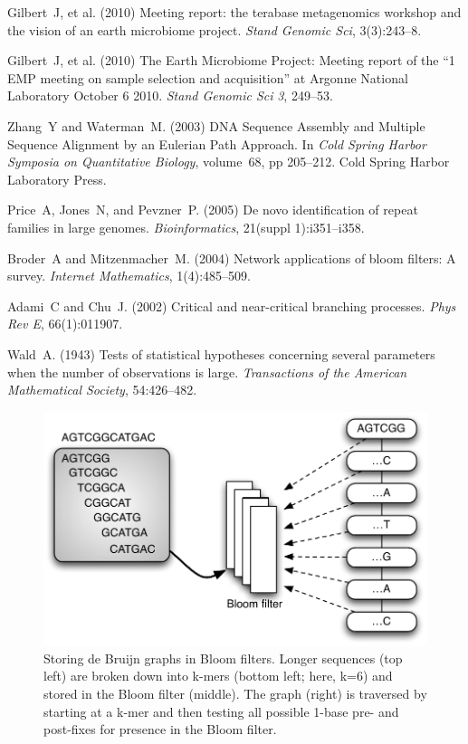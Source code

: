 \documentclass{pnastwo}
\begin{document}
\begin{article}
\begin{thebibliography}{10}
 Gilbert~J, et al. (2010) Meeting report: the terabase 
metagenomics workshop and the vision of an earth microbiome project. {\it 
Stand Genomic Sci}, 3(3):243--8.

 Gilbert~J, et al. (2010) The Earth Microbiome Project: 
Meeting report of the ``1 EMP meeting on sample selection and acquisition'' 
at Argonne National Laboratory October 6 2010. {\it Stand Genomic Sci} 
\emph{3}, 249--53.

 Zhang~Y and Waterman~M. (2003) DNA Sequence Assembly 
and Multiple Sequence Alignment by an Eulerian Path Approach. In {\it Cold 
Spring Harbor Symposia on Quantitative Biology}, volume~68, pp 205--212. 
Cold Spring Harbor Laboratory Press.

 Price~A, Jones~N, and Pevzner~P. (2005) De novo 
identification of repeat families in large genomes. {\it Bioinformatics}, 
21(suppl 1):i351--i358.

Broder~A and Mitzenmacher~M. (2004) Network applications of bloom filters: 
A survey. {\it Internet Mathematics}, 1(4):485--509.

 Adami~C and Chu~J. (2002) Critical and 
near-critical branching processes. {\it Phys Rev E}, 66(1):011907.

 Wald~A. (1943) Tests of statistical hypotheses concerning 
several parameters when the number of observations is large. {\it Transactions 
of the American Mathematical Society}, 54:426--482.

\end{thebibliography}

\end{article}

\clearpage

\begin{figure}
\centering
\includegraphics[width=5in]{bloomgraph}
\caption{Storing de Bruijn graphs in Bloom filters.  Longer sequences (top left) are broken down into k-mers (bottom left; here, k=6) and stored in the Bloom filter (middle).
The graph (right) is traversed by starting at a k-mer and then testing all possible 1-base pre- and post-fixes for presence in the Bloom filter.}

\label{fig:bloomgraph}
\end{figure}
\end{document}
